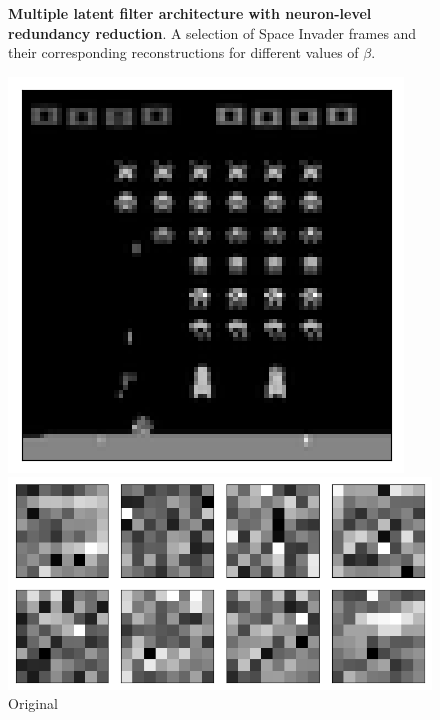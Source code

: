 \begin{figure}[h!]
\begin{multicols}{4}
    \caption{$\beta = 32$}
\end{multicols}
\caption{\textbf{Multiple latent filter architecture with neuron-level redundancy reduction}. A selection of Space Invader frames and their corresponding reconstructions for different values of $\beta$.}
\label{fig:indiscriminate_decoupling_originals_and_reconstructions}
\end{figure}


\begin{figure}[h!]
\centering
\captionsetup{justification=centering}
\begin{minipage}{0.4\textwidth}
\centering
\captionsetup{justification=centering}
\includegraphics[scale=0.4]{figures/results/indiscriminate_decoupling/beta_1_sample_3_original.png}
\caption{Original}
\end{minipage}
\begin{minipage}{0.55\textwidth}
\centering
\captionsetup{justification=centering}
\includegraphics[scale=0.42]{figures/results/indiscriminate_decoupling/beta_1_convolutional_layers_sample_3.png}

\end{minipage}
\end{figure}
